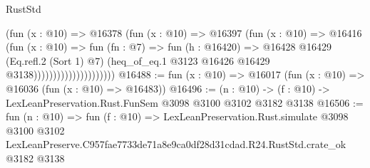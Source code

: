 \begin{lexlean}{RustStd}
\begin{coremodule}
                                    (fun (x : @10) =>
                                    @16378
                                      (fun (x : @10) =>
                                      @16397
                                        (fun (x : @10) =>
                                        @16416
                                          (fun (x : @10) =>
                                          fun (fn : @7) =>
                                          fun (h : @16420) =>
                                          @16428
                                            @16429
                                            (Eq.refl.{2} (Sort 1) @7)
                                            (heq_of_eq.{1}
                                              @3123
                                              @16426
                                              @16429
                                              @3138)))))))))))))))))))))
@16488 := fun (x : @10) => @16017 (fun (x : @10) => @16036 (fun (x : @10) => @16483))
@16496 := (n : @10) -> (f : @10) -> LexLeanPreservation.Rust.FunSem @3098 @3100 @3102 @3182 @3138
@16506 := fun (n : @10) =>
  fun (f : @10) =>
  LexLeanPreservation.Rust.simulate
    @3098
    @3100
    @3102
    LexLeanPreserve.C957fae7733de71a8e9ca0df28d31cdad.R24.RustStd.crate_ok
    @3182
    @3138
\end{coremodule}
\end{lexlean}
